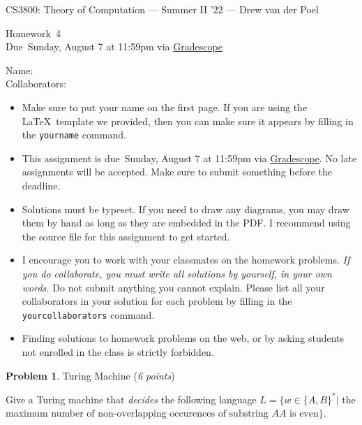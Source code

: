 \documentclass[11pt]{article}
\newcommand{\yourname}{}
\newcommand{\yourcollaborators}{}
\theoremstyle{definition}
\newcommand{\instructor}{Drew van der Poel}
\newcommand{\hwnum}{4}
\newcommand{\hwdue}{Sunday, August 7 at 11:59pm via \href{https://www.gradescope.com/courses/406943}{Gradescope}}
\theoremstyle{theorem}
\newtheorem{prob}{Problem}
\begin{document}
{\Large 
\begin{center}{CS3800: Theory of Computation} --- Summer II '22 --- \instructor \end{center}}
{\large
\vspace{10pt}
\noindent Homework~\hwnum \vspace{2pt}\\
Due~\hwdue}

\bigskip
{\large
\noindent Name: \yourname \vspace{2pt}\\ Collaborators: \yourcollaborators}

\vspace{15pt}
\begin{itemize}

\item Make sure to put your name on the first page.  If you are using the \LaTeX~template we provided, then you can make sure it appears by filling in the \texttt{yourname} command.

\item This assignment is due~\hwdue.  No late assignments will be accepted.  Make sure to submit something before the deadline.

\item Solutions must be typeset.  If you need to draw any diagrams, you may draw them by hand as long as they are embedded in the PDF.  I recommend using the source file for this assignment to get started.

\item I encourage you to work with your classmates on the homework problems. \emph{If you do collaborate, you must write all solutions by yourself, in your own words.}  Do not submit anything you cannot explain.  Please list all your collaborators in your solution for each problem by filling in the \texttt{yourcollaborators} command.

\item Finding solutions to homework problems on the web, or by asking students not enrolled in the class is strictly forbidden.

\end{itemize}



\newpage

\begin{prob} Turing Machine (\emph{6 points})\end{prob}

Give a Turing machine that \emph{decides} the following language $L = \{ w \in \{A,B\}^* |$ the maximum number 
$ \text{of non-overlapping occurences of substring~} AA \text{~is even}\}$.
\end{document}
